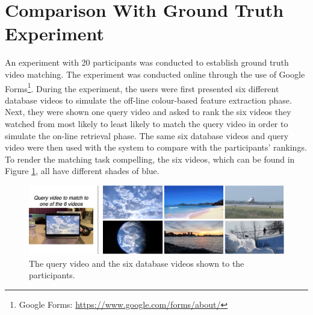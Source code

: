 
\section{Comparison With Ground Truth Experiment}

An experiment with 20 participants was conducted to establish ground truth video matching. The experiment was conducted online through the use of Google Forms\footnote{Google Forms: \url{https://www.google.com/forms/about/}}. During the experiment, the users were first presented six different database videos to simulate the off-line colour-based feature extraction phase. Next, they were shown one query video and asked to rank the six videos they watched from most likely to least likely to match the query video in order to simulate the on-line retrieval phase. The same six database videos and query video were then used with the system to compare with the participants' rankings. To render the matching task compelling, the six videos, which can be found in Figure \ref{fig:evaluation-online_experiment_dbvideos}, all have different shades of blue.

\begin{figure}[h] 
\centerline{\includegraphics[width=\textwidth]{figures/evaluation/online_experiment_dbvideos.png}}
\caption{\label{fig:evaluation-online_experiment_dbvideos}The query video and the six database videos shown to the participants.}
\end{figure}

